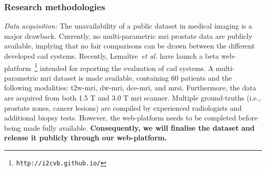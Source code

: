 
\subsubsection{Research methodologies}
\label{sec:methodologies}

\emph{Data acquisition:}
The unavailability of a public dataset in medical imaging is a major drawback.
Currently, no multi-parametric \ac{mri} prostate data are publicly available, implying that no fair comparisons can be drawn between the different developed \ac{cad} systems.
Recently, Lema\^itre~\emph{et al.} have launch a beta web-platform~\footnote{\texttt{http://i2cvb.github.io/}} intended for reporting the evaluation of \ac{cad} systems.
A multi-parametric \ac{mri} dataset is made available, containing 60 patients and the following modalities: \ac{t2w}-\ac{mri}, \ac{dw}-\ac{mri}, \ac{dce}-\ac{mri}, and \ac{mrsi}.
Furthermore, the data are acquired from both 1.5 T and 3.0 T \ac{mri} scanner.
Multiple ground-truths (i.e., prostate zones, cancer lesions) are compiled by experienced radiologists and additional biopsy tests.
However, the web-platform needs to be completed before being made fully available.
\textbf{Consequently, we will finalise the dataset and release it publicly through our web-platform.}

